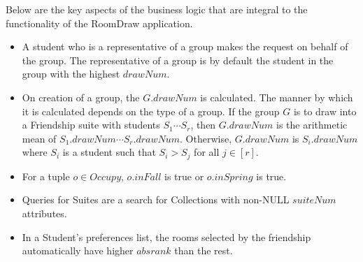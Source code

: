 \documentclass{article}
\begin{document}
\noindent Below are the key aspects of the business logic that are integral to the functionality of the RoomDraw application.

\begin{itemize}
\item A student who is a representative of a group makes the request on behalf of the group. The representative of a group is by default the student in the group with the highest $drawNum$.

\item On creation of a group, the $G.drawNum$ is calculated. The manner by which it is calculated depends on the type of a group.  If the group $G$ is to draw into a Friendship suite with students $S_1 \cdots S_r$, then $G.drawNum$ is the arithmetic mean of $S_1.drawNum \cdots S_r.drawNum$. Otherwise, $G.drawNum$ is $S_i.drawNum$ where $S_i$ is a student such that $S_i > S_j$ for all $j \in [r]$.

\item For a tuple $o \in Occupy$, $o.inFall$ is true or $o.inSpring$ is true.

\item Queries for Suites are a search for Collections with non-NULL $suiteNum$ attributes.

\item In a Student's preferences list, the rooms selected by the friendship automatically have higher $absrank$ than the rest.
\end{itemize}
\end{document}
